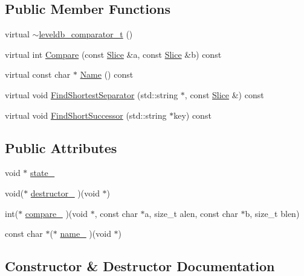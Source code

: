 \subsection*{Public Member Functions}
\begin{DoxyCompactItemize}
\item 
virtual \mbox{\hyperlink{structleveldb__comparator__t_a6717afb2ab1eebb8402b63f00a6d1c35}{$\sim$leveldb\+\_\+comparator\+\_\+t}} ()
\item 
virtual int \mbox{\hyperlink{structleveldb__comparator__t_abad34abeefd52bcfd421e14f426f6d05}{Compare}} (const \mbox{\hyperlink{classleveldb_1_1_slice}{Slice}} \&a, const \mbox{\hyperlink{classleveldb_1_1_slice}{Slice}} \&b) const
\item 
virtual const char $\ast$ \mbox{\hyperlink{structleveldb__comparator__t_aaf7e79d77687d0542037ae5310296180}{Name}} () const
\item 
virtual void \mbox{\hyperlink{structleveldb__comparator__t_ad5bc952c5129d060c1ffe7a830eb3820}{Find\+Shortest\+Separator}} (std\+::string $\ast$, const \mbox{\hyperlink{classleveldb_1_1_slice}{Slice}} \&) const
\item 
virtual void \mbox{\hyperlink{structleveldb__comparator__t_a46671a92506b28d1df61125499df3d23}{Find\+Short\+Successor}} (std\+::string $\ast$key) const
\end{DoxyCompactItemize}
\subsection*{Public Attributes}
\begin{DoxyCompactItemize}
\item 
void $\ast$ \mbox{\hyperlink{structleveldb__comparator__t_a720da927befa8098f21437c663d0b0e2}{state\+\_\+}}
\item 
void($\ast$ \mbox{\hyperlink{structleveldb__comparator__t_a757b51457e991ab2219fd5931426bb29}{destructor\+\_\+}} )(void $\ast$)
\item 
int($\ast$ \mbox{\hyperlink{structleveldb__comparator__t_a55906beb72b9f3502c941c16c1187719}{compare\+\_\+}} )(void $\ast$, const char $\ast$a, size\+\_\+t alen, const char $\ast$b, size\+\_\+t blen)
\item 
const char $\ast$($\ast$ \mbox{\hyperlink{structleveldb__comparator__t_a0ed64d60a3e077ed065d745fb6bdee15}{name\+\_\+}} )(void $\ast$)
\end{DoxyCompactItemize}


\subsection{Constructor \& Destructor Documentation}
\mbox{\label{structleveldb__comparator__t_a6717afb2ab1eebb8402b63f00a6d1c35}} 
